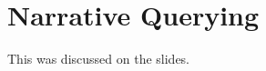 \section{Narrative Querying}\label{sec:bolquery:narr}

This was discussed on the slides.

%
%
%
%




